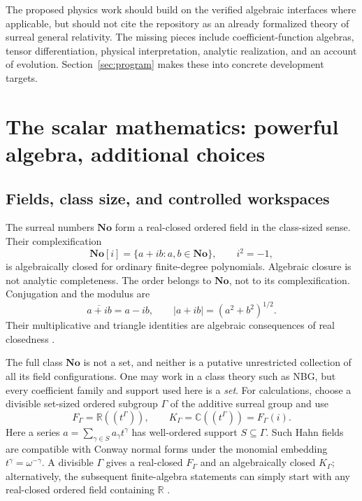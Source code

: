 \documentclass[11pt,a4paper]{article}
\numberwithin{equation}{section}
\theoremstyle{definition}
\theoremstyle{remark}
\newcommand{\No}{\mathbf{No}}
\newcommand{\SC}{\No[i]}
\newcommand{\R}{\mathbb R}
\newcommand{\C}{\mathbb C}
\newcommand{\F}{F_{\Gamma}}
\newcommand{\K}{K_{\Gamma}}
\begin{document}
The proposed physics work should build on the verified algebraic interfaces where applicable, but should not cite the repository as an already formalized theory of surreal general relativity. The missing pieces include coefficient-function algebras, tensor differentiation, physical interpretation, analytic realization, and an account of evolution. Section~\ref{sec:program} makes these into concrete development targets.

\section{The scalar mathematics: powerful algebra, additional choices}
\label{sec:scalars}

\subsection{Fields, class size, and controlled workspaces}
The surreal numbers $\No$ form a real-closed ordered field in the class-sized sense. Their complexification
\begin{equation}
 \SC=\{a+ib:a,b\in\No\},\qquad i^2=-1,
\end{equation}
is algebraically closed for ordinary finite-degree polynomials. Algebraic closure is not analytic completeness. The order belongs to $\No$, not to its complexification. Conjugation and the modulus are
\begin{equation}
 \overline{a+ib}=a-ib,\qquad |a+ib|=(a^2+b^2)^{1/2}.
\end{equation}
Their multiplicative and triangle identities are algebraic consequences of real closedness \cite{RepoAnalysis,CE}.

The full class $\No$ is not a set, and neither is a putative unrestricted collection of all its field configurations. One may work in a class theory such as NBG, but every coefficient family and support used here is a \emph{set}. For calculations, choose a divisible set-sized ordered subgroup $\Gamma$ of the additive surreal group and use
\begin{equation}\label{eq:workspace}
 \F=\R((t^\Gamma)),\qquad
 \K=\C((t^\Gamma))=\F(i).
\end{equation}
Here a series $a=\sum_{\gamma\in S}a_\gamma t^\gamma$ has well-ordered support $S\subseteq\Gamma$. Such Hahn fields are compatible with Conway normal forms under the monomial embedding $t^\gamma=\omega^{-\gamma}$. A divisible $\Gamma$ gives a real-closed $\F$ and an algebraically closed $\K$; alternatively, the subsequent finite-algebra statements can simply start with any real-closed ordered field containing $\R$ \cite{RepoAnalysis}.
\end{document}
